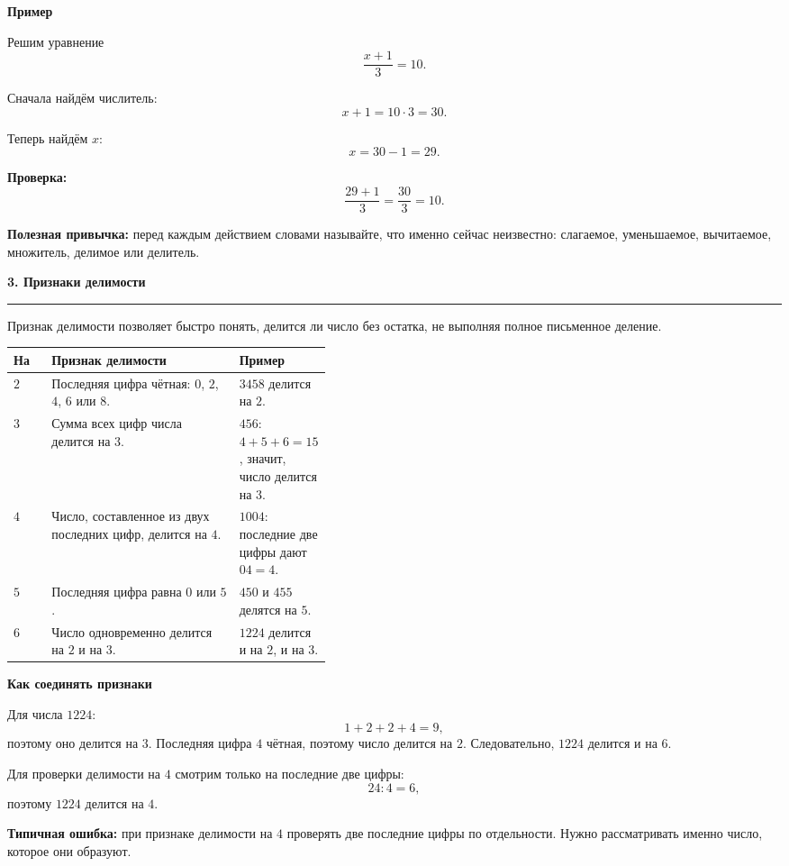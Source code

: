 \documentclass[a4paper,12pt]{article}
\newcommand{\sectiontitle}[1]{%
  \vspace{0.25em}%
  {\Large\bfseries\color{darkaccent}#1\par}%
  \vspace{0.3em}%
  {\color{linegray}\rule{\linewidth}{0.6pt}}%
  \vspace{0.5em}%
}
\newcommand{\subsectiontitle}[1]{%
  \vspace{0.2em}%
  {\large\bfseries\color{accent}#1\par}%
  \vspace{0.15em}%
}
\newcommand{\important}[1]{\textbf{\textcolor{darkaccent}{#1}}}
\begin{document}
\subsectiontitle{Пример}

Решим уравнение
\[
  \frac{x+1}{3}=10.
\]

Сначала найдём числитель:
\[
  x+1=10\cdot3=30.
\]

Теперь найдём $x$:
\[
  x=30-1=29.
\]

\important{Проверка:}
\[
  \frac{29+1}{3}=\frac{30}{3}=10.
\]

\important{Полезная привычка:} перед каждым действием словами называйте, что именно сейчас неизвестно: слагаемое, уменьшаемое, вычитаемое, множитель, делимое или делитель.

\clearpage

\sectiontitle{3. Признаки делимости}

Признак делимости позволяет быстро понять, делится ли число без остатка, не выполняя полное письменное деление.

\renewcommand{\arraystretch}{1.45}
\begin{center}
\begin{tabularx}{\linewidth}{@{}p{0.12\linewidth}Xp{0.29\linewidth}@{}}
\toprule
\textbf{На}
&
\textbf{Признак делимости}
&
\textbf{Пример}
\\
\midrule
$2$
&
Последняя цифра чётная: $0$, $2$, $4$, $6$ или $8$.
&
$3458$ делится на $2$.
\\
$3$
&
Сумма всех цифр числа делится на $3$.
&
$456$: $4+5+6=15$, значит, число делится на $3$.
\\
$4$
&
Число, составленное из двух последних цифр, делится на $4$.
&
$1004$: последние две цифры дают $04=4$.
\\
$5$
&
Последняя цифра равна $0$ или $5$.
&
$450$ и $455$ делятся на $5$.
\\
$6$
&
Число одновременно делится на $2$ и на $3$.
&
$1224$ делится и на $2$, и на $3$.
\\
\bottomrule
\end{tabularx}
\end{center}

\subsectiontitle{Как соединять признаки}

Для числа $1224$:
\[
  1+2+2+4=9,
\]
поэтому оно делится на $3$. Последняя цифра $4$ чётная, поэтому число делится на $2$. Следовательно, $1224$ делится и на $6$.

Для проверки делимости на $4$ смотрим только на последние две цифры:
\[
  24:4=6,
\]
поэтому $1224$ делится на $4$.

\important{Типичная ошибка:} при признаке делимости на $4$ проверять две последние цифры по отдельности. Нужно рассматривать именно число, которое они образуют.
\end{document}
